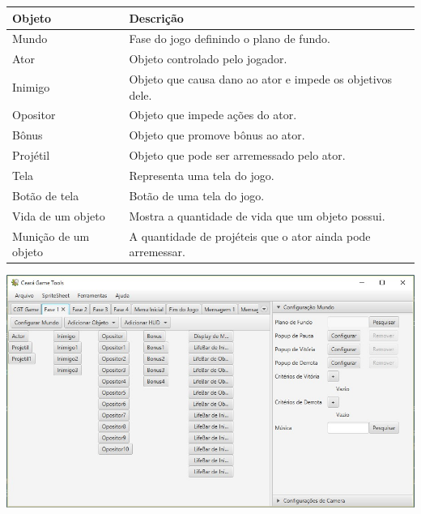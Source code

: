 \documentclass[]{beamer}
\begin{document}
   \begin{frame}
      \begin{center}
         \begin{tabular}{ p{6em} | p{20em} }
         \textbf{Objeto} & \textbf{Descrição} \\
         \hline
         Mundo & Fase do jogo definindo o plano de fundo.  \\
         \hline
         Ator & Objeto controlado pelo jogador. \\
         \hline
         Inimigo & Objeto que causa dano ao ator e impede os objetivos dele. \\
         \hline
         Opositor & Objeto que impede ações do ator.  \\
         \hline
         Bônus & Objeto que promove bônus ao ator. \\
         \hline
         Projétil & Objeto que pode ser arremessado pelo ator. \\
         \hline
         Tela & Representa uma tela do jogo. \\
         \hline
         Botão de tela & Botão de uma tela do jogo. \\
         \hline
         Vida de um objeto & Mostra a quantidade de vida que um objeto possui. \\
         \hline
         Munição de um objeto & A quantidade de projéteis que o ator ainda pode arremessar. \\
      \end{tabular}
   \end{center}
   \end{frame}

   \begin{frame}
      \includegraphics[width=\textwidth]{images/objetos_disposicao.jpg}
   \end{frame}
\end{document}
